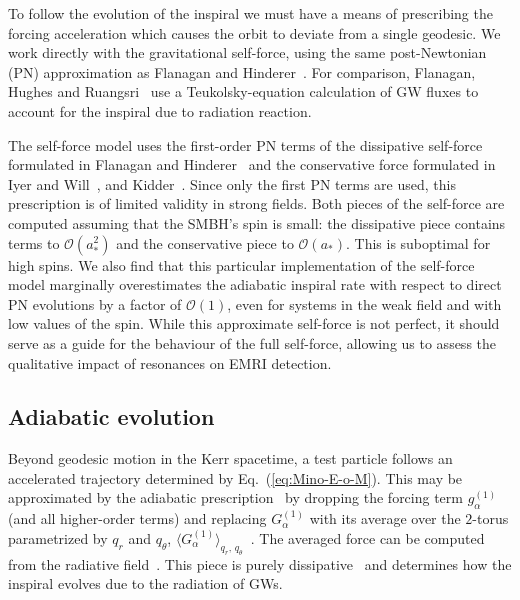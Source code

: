 \documentclass[aps,prd,amsfonts,amssymb,amsmath,nofootinbib,showpacs,superscriptaddress,twocolumn,floatfix]{revtex4-1}
\newcommand{\eqnref}[1]{Eq.~(\ref{eq:#1})}
\newcommand{\order}[1]{\ensuremath{\mathcal{O}({#1})}}
\begin{document}
To follow the evolution of the inspiral we must have a means of prescribing the forcing acceleration which causes the orbit to deviate from a single geodesic. We work directly with the gravitational self-force, using the same post-Newtonian (PN) approximation as Flanagan and Hinderer~\cite{Flanagan2012}. For comparison, Flanagan, Hughes and Ruangsri~\cite{Flanagan2012a} use a Teukolsky-equation calculation of GW fluxes to account for the inspiral due to radiation reaction.

The self-force model uses the first-order PN terms of the dissipative self-force formulated in Flanagan and Hinderer~\cite{Flanagan2007} and the conservative force formulated in Iyer and Will~\cite{Iyer1993}, and Kidder~\cite{Kidder1995}. Since only the first PN terms are used, this prescription is of limited validity in strong fields. Both pieces of the self-force are computed assuming that the SMBH's spin is small: the dissipative piece contains terms to $\order{a_\ast^2}$ and the conservative piece to $\order{a_\ast}$. This is suboptimal for high spins. We also find that this particular implementation of the self-force model marginally overestimates the adiabatic inspiral rate with respect to direct PN evolutions by a factor of $\mathcal{O}(1)$, even for systems in the weak field and with low values of the spin. While this approximate self-force is not perfect, it should serve as a guide for the behaviour of the full self-force, allowing us to assess the qualitative impact of resonances on EMRI detection.


\subsection{Adiabatic evolution}
\label{sec:adiabatic}

Beyond geodesic motion in the Kerr spacetime, a test particle follows an accelerated trajectory determined by \eqnref{Mino-E-o-M}. This may be approximated by the adiabatic prescription~\cite{Hinderer2008} by dropping the forcing term $g_\alpha^{(1)}$ (and all higher-order terms) and replacing $G_\alpha^{(1)}$ with its average over the $2$-torus parametrized by $q_r$ and $q_\theta$, $\langle G_\alpha^{(1)}\rangle_{q_r,\,q_\theta}$~\cite{Drasco2005,Grossman2011}. The averaged force can be computed from the radiative field~\cite{Galtsov1982,Mino2003,Sago2006,Ganz2007}. This piece is purely dissipative~\cite{Pound2005} and determines how the inspiral evolves due to the radiation of GWs.
\end{document}
